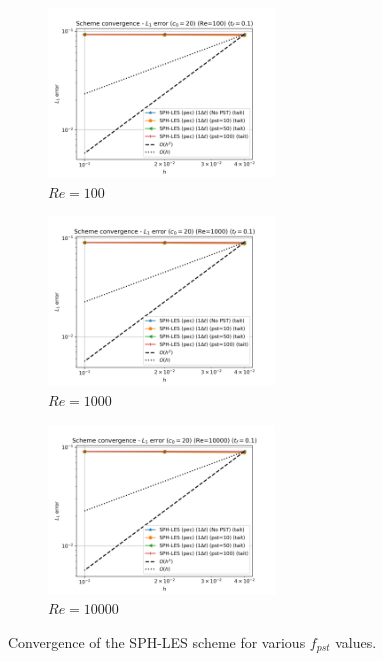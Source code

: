 \begin{figure}[htbp!]
  \begin{subfigure}{7cm}
    \centering\includegraphics[width=6cm]{Code-Figures/okra2022/pst/dt_pois_conv_c0_20_re_100.png}
    \caption{$Re = 100$}
  \end{subfigure}
  \begin{subfigure}{7cm}
    \centering\includegraphics[width=6cm]{Code-Figures/okra2022/pst/dt_pois_conv_c0_20_re_1000.png}
    \caption{$Re = 1000$}
  \end{subfigure}
  \begin{subfigure}{7cm}
    \centering\includegraphics[width=6cm]{Code-Figures/okra2022/pst/dt_pois_conv_c0_20_re_10000.png}
    \caption{$Re = 10000$}
  \end{subfigure}
  \caption{Convergence of the SPH-LES scheme for various $f_{pst}$ values.}
  \label{fig:okra2022-pst}
\end{figure}


